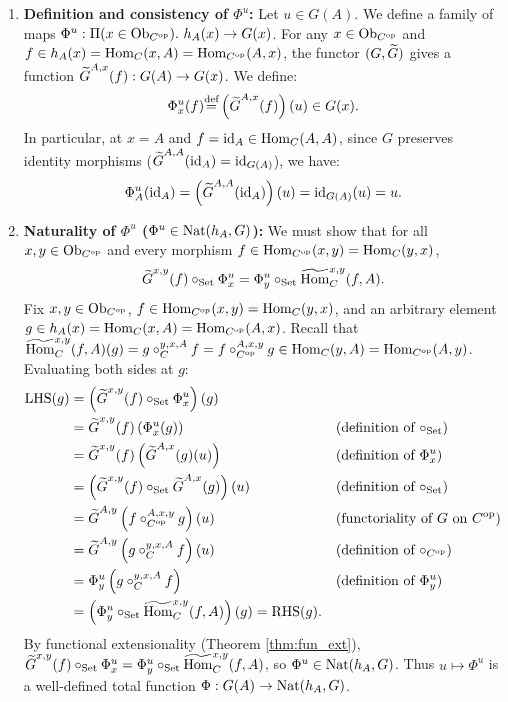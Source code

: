\documentclass[10pt,a4paper]{article}
\begin{document}
\myprf
\begin{enumerate}
\item \textbf{Definition and consistency of $\Phi^u$:}
Let $u \in G(A)$. We define a family of maps $\Phi^u : \Pi(x \in {\textrm{Ob}}_{C^{\textrm{op}}}).\ h_A(x) \to G(x)$.
For any $x \in {\textrm{Ob}}_{C^{\textrm{op}}}$ and $f \in h_A(x) = {\textrm{Hom}}_C(x,A) = {\textrm{Hom}}_{C^{\textrm{op}}}(A,x)$, the functor $(G, {\widetilde{G}\textrm{}})$ gives a function ${\widetilde{G}\textrm{}}^{A,x}(f) : G(A) \to G(x)$. We define:
$$\Phi^u_x(f) {\stackrel{{\textrm{def}}}{=}} \left({\widetilde{G}\textrm{}}^{A,x}(f)\right)(u) \in G(x).$$
In particular, at $x = A$ and $f = {\textrm{id}}_A \in {\textrm{Hom}}_C(A,A)$, since $G$ preserves identity morphisms (${\widetilde{G}\textrm{}}^{A,A}({\textrm{id}}_A) = {\textrm{id}}_{G(A)}$), we have:
$$\Phi^u_A({\textrm{id}}_A) = \left({\widetilde{G}\textrm{}}^{A,A}({\textrm{id}}_A)\right)(u) = {\textrm{id}}_{G(A)}(u) = u.$$

\item \textbf{Naturality of $\Phi^u$ ($\Phi^u \in {\textrm{Nat}}(h_A, G)$):}
We must show that for all $x, y \in {\textrm{Ob}}_{C^{\textrm{op}}}$ and every morphism $f \in {\textrm{Hom}}_{C^{\textrm{op}}}(x,y) = {\textrm{Hom}}_C(y,x)$,
$${\widetilde{G}\textrm{}}^{x,y}(f) \circ_{\textrm{Set}} \Phi^u_x = \Phi^u_y \circ_{\textrm{Set}} {\widetilde{{\textrm{Hom}}}\textrm{}}_C^{x,y}(f,A).$$
Fix $x, y \in {\textrm{Ob}}_{C^{\textrm{op}}}$, $f \in {\textrm{Hom}}_{C^{\textrm{op}}}(x,y) = {\textrm{Hom}}_C(y,x)$, and an arbitrary element $g \in h_A(x) = {\textrm{Hom}}_C(x,A) = {\textrm{Hom}}_{C^{\textrm{op}}}(A,x)$.
Recall that ${\widetilde{{\textrm{Hom}}}\textrm{}}_C^{x,y}(f,A)(g) = g \circ_C^{y,x,A} f = f \circ_{C^{\textrm{op}}}^{A,x,y} g \in {\textrm{Hom}}_C(y,A) = {\textrm{Hom}}_{C^{\textrm{op}}}(A,y)$.
Evaluating both sides at $g$:
\begin{align*}
\textrm{LHS}(g) &= \left({\widetilde{G}\textrm{}}^{x,y}(f) \circ_{\textrm{Set}} \Phi^u_x\right)(g) \\
&= {\widetilde{G}\textrm{}}^{x,y}(f)\left(\Phi^u_x(g)\right) && \text{(definition of $\circ_{\textrm{Set}}$)} \\
&= {\widetilde{G}\textrm{}}^{x,y}(f)\left({\widetilde{G}\textrm{}}^{A,x}(g)(u)\right) && \text{(definition of $\Phi^u_x$)} \\
&= \left({\widetilde{G}\textrm{}}^{x,y}(f) \circ_{\textrm{Set}} {\widetilde{G}\textrm{}}^{A,x}(g)\right)(u) && \text{(definition of $\circ_{\textrm{Set}}$)} \\
&= {\widetilde{G}\textrm{}}^{A,y}\left(f \circ_{C^{\textrm{op}}}^{A,x,y} g\right)(u) && \text{(functoriality of $G$ on $C^{\textrm{op}}$)} \\
&= {\widetilde{G}\textrm{}}^{A,y}\left(g \circ_C^{y,x,A} f\right)(u) && \text{(definition of $\circ_{C^{\textrm{op}}}$)} \\
&= \Phi^u_y\left(g \circ_C^{y,x,A} f\right) && \text{(definition of $\Phi^u_y$)} \\
&= \left(\Phi^u_y \circ_{\textrm{Set}} {\widetilde{{\textrm{Hom}}}\textrm{}}_C^{x,y}(f,A)\right)(g) = \textrm{RHS}(g).
\end{align*}
By functional extensionality (Theorem \ref{thm:fun_ext}), ${\widetilde{G}\textrm{}}^{x,y}(f) \circ_{\textrm{Set}} \Phi^u_x = \Phi^u_y \circ_{\textrm{Set}} {\widetilde{{\textrm{Hom}}}\textrm{}}_C^{x,y}(f,A)$, so $\Phi^u \in {\textrm{Nat}}(h_A, G)$. Thus $u \mapsto \Phi^u$ is a well-defined total function $\Phi : G(A) \to {\textrm{Nat}}(h_A, G)$.


\end{enumerate}
\end{document}
